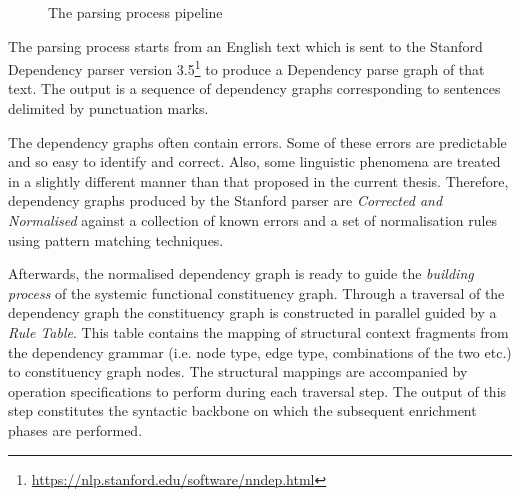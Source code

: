 \begin{figure}[!ht]
    \caption[]{The parsing process pipeline}
    \label{fig:pipeline-overview}
\end{figure}


The parsing process starts from an English text which is sent to the Stanford Dependency parser \citep{chen2014fast} version 3.5\footnote{\url{https://nlp.stanford.edu/software/nndep.html}} to produce a Dependency parse graph of that text. The output is a sequence of dependency graphs corresponding to sentences delimited by punctuation marks.

The dependency graphs often contain errors. Some of these errors are predictable and so easy to identify and correct. Also, some linguistic phenomena are treated in a slightly different manner than that proposed in the current thesis. Therefore, dependency graphs produced by the Stanford parser are \textit{Corrected and Normalised} against a collection of known errors and a set of normalisation rules using pattern matching techniques.

Afterwards, the normalised dependency graph is ready to guide the \textit{building process} of the systemic functional constituency graph. Through a traversal of the dependency graph the constituency graph is constructed in parallel guided by a \textit{Rule Table}. This table contains the mapping of structural context fragments from the dependency grammar (i.e. node type, edge type, combinations of the two etc.) to constituency graph nodes. The structural mappings are accompanied by operation specifications to perform during each traversal step. The output of this step constitutes the syntactic backbone on which the subsequent enrichment phases are performed.

